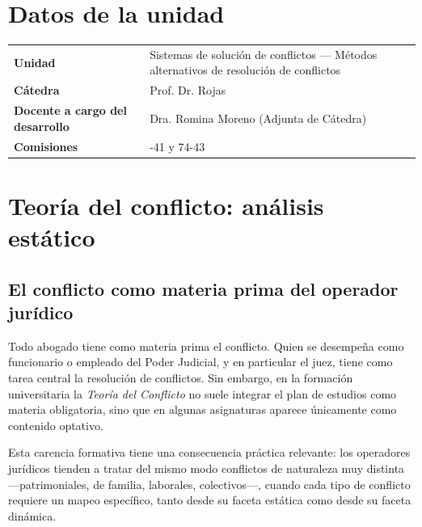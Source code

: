 \documentclass[12pt,oneside]{book}
\begin{document}
\chapter*{Datos de la unidad}

\begin{center}
\begin{tabularx}{0.9\textwidth}{>{\raggedright\arraybackslash}X >{\raggedright\arraybackslash}X}
\toprule
\textbf{Unidad} & Sistemas de solución de conflictos --- Métodos alternativos de resolución de conflictos \\
\textbf{Cátedra} & Prof. Dr. Rojas \\
\textbf{Docente a cargo del desarrollo} & Dra. Romina Moreno (Adjunta de Cátedra) \\
\textbf{Comisiones} & 74-41 y 74-43 \\
\bottomrule
\end{tabularx}
\end{center}

\tableofcontents

\chapter{Teoría del conflicto: análisis estático}

\section{El conflicto como materia prima del operador jurídico}

Todo abogado tiene como materia prima el conflicto. Quien se desempeña como funcionario o empleado del Poder Judicial, y en particular el juez, tiene como tarea central la resolución de conflictos. Sin embargo, en la formación universitaria la \textit{Teoría del Conflicto} no suele integrar el plan de estudios como materia obligatoria, sino que en algunas asignaturas aparece únicamente como contenido optativo.

Esta carencia formativa tiene una consecuencia práctica relevante: los operadores jurídicos tienden a tratar del mismo modo conflictos de naturaleza muy distinta ---patrimoniales, de familia, laborales, colectivos---, cuando cada tipo de conflicto requiere un mapeo específico, tanto desde su faceta estática como desde su faceta dinámica.
\end{document}

